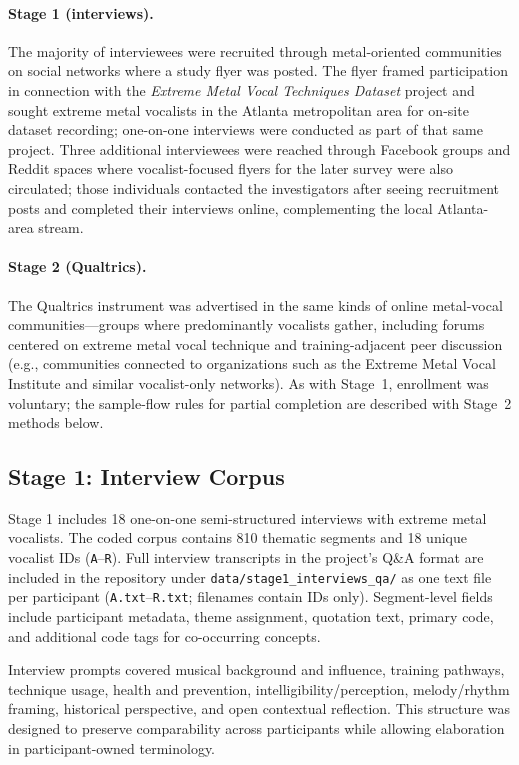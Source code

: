 \documentclass{article}
\begin{document}
\paragraph{Stage 1 (interviews).}
The majority of interviewees were recruited through metal-oriented communities on social networks where a study flyer was posted.
The flyer framed participation in connection with the \emph{Extreme Metal Vocal Techniques Dataset} project and sought extreme metal vocalists in the Atlanta metropolitan area for on-site dataset recording; one-on-one interviews were conducted as part of that same project.
Three additional interviewees were reached through Facebook groups and Reddit spaces where vocalist-focused flyers for the later survey were also circulated; those individuals contacted the investigators after seeing recruitment posts and completed their interviews online, complementing the local Atlanta-area stream.

\paragraph{Stage 2 (Qualtrics).}
The Qualtrics instrument was advertised in the same kinds of online metal-vocal communities---groups where predominantly vocalists gather, including forums centered on extreme metal vocal technique and training-adjacent peer discussion (e.g., communities connected to organizations such as the Extreme Metal Vocal Institute and similar vocalist-only networks).
As with Stage~1, enrollment was voluntary; the sample-flow rules for partial completion are described with Stage~2 methods below.

\subsection{Stage 1: Interview Corpus}
Stage 1 includes 18 one-on-one semi-structured interviews with extreme metal vocalists.
The coded corpus contains 810 thematic segments and 18 unique vocalist IDs (\texttt{A}--\texttt{R}).
Full interview transcripts in the project's Q\&A format are included in the repository under \texttt{data/stage1\_interviews\_qa/} as one text file per participant (\texttt{A.txt}--\texttt{R.txt}; filenames contain IDs only).
Segment-level fields include participant metadata, theme assignment, quotation text, primary code, and additional code tags for co-occurring concepts.

Interview prompts covered musical background and influence, training pathways, technique usage, health and prevention, intelligibility/perception, melody/rhythm framing, historical perspective, and open contextual reflection.
This structure was designed to preserve comparability across participants while allowing elaboration in participant-owned terminology.
\end{document}
